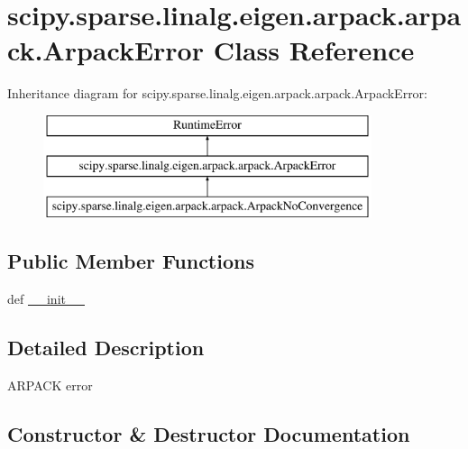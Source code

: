 \hypertarget{classscipy_1_1sparse_1_1linalg_1_1eigen_1_1arpack_1_1arpack_1_1ArpackError}{}\section{scipy.\+sparse.\+linalg.\+eigen.\+arpack.\+arpack.\+Arpack\+Error Class Reference}
\label{classscipy_1_1sparse_1_1linalg_1_1eigen_1_1arpack_1_1arpack_1_1ArpackError}
Inheritance diagram for scipy.\+sparse.\+linalg.\+eigen.\+arpack.\+arpack.\+Arpack\+Error\+:\begin{figure}[H]
\begin{center}
\leavevmode
\includegraphics[height=3.000000cm]{classscipy_1_1sparse_1_1linalg_1_1eigen_1_1arpack_1_1arpack_1_1ArpackError}
\end{center}
\end{figure}
\subsection*{Public Member Functions}
\begin{DoxyCompactItemize}
\item 
def \hyperlink{classscipy_1_1sparse_1_1linalg_1_1eigen_1_1arpack_1_1arpack_1_1ArpackError_a439b0b9f0243b8a68c827ef1860f97b2}{\+\_\+\+\_\+init\+\_\+\+\_\+}
\end{DoxyCompactItemize}


\subsection{Detailed Description}
\begin{DoxyVerb}ARPACK error
\end{DoxyVerb}
 

\subsection{Constructor \& Destructor Documentation}
\hypertarget{classscipy_1_1sparse_1_1linalg_1_1eigen_1_1arpack_1_1arpack_1_1ArpackError_a439b0b9f0243b8a68c827ef1860f97b2}{}
